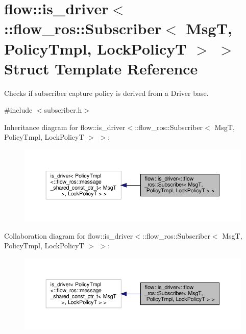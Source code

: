 \hypertarget{structflow_1_1is__driver_3_1_1flow__ros_1_1_subscriber_3_01_msg_t_00_01_policy_tmpl_00_01_lock_policy_t_01_4_01_4}{}\section{flow\+:\+:is\+\_\+driver$<$\+:\+:flow\+\_\+ros\+:\+:Subscriber$<$ MsgT, Policy\+Tmpl, Lock\+PolicyT $>$ $>$ Struct Template Reference}
\label{structflow_1_1is__driver_3_1_1flow__ros_1_1_subscriber_3_01_msg_t_00_01_policy_tmpl_00_01_lock_policy_t_01_4_01_4}


Checks if subscriber capture policy is derived from a Driver base.  




{\ttfamily \#include $<$subscriber.\+h$>$}



Inheritance diagram for flow\+:\+:is\+\_\+driver$<$\+:\+:flow\+\_\+ros\+:\+:Subscriber$<$ MsgT, Policy\+Tmpl, Lock\+PolicyT $>$ $>$\+:\nopagebreak
\begin{figure}[H]
\begin{center}
\leavevmode
\includegraphics[width=350pt]{structflow_1_1is__driver_3_1_1flow__ros_1_1_subscriber_3_01_msg_t_00_01_policy_tmpl_00_01_lock_pad823e27bc9f39ecff1cc3ffbaaad8f4}
\end{center}
\end{figure}


Collaboration diagram for flow\+:\+:is\+\_\+driver$<$\+:\+:flow\+\_\+ros\+:\+:Subscriber$<$ MsgT, Policy\+Tmpl, Lock\+PolicyT $>$ $>$\+:\nopagebreak
\begin{figure}[H]
\begin{center}
\leavevmode
\includegraphics[width=350pt]{structflow_1_1is__driver_3_1_1flow__ros_1_1_subscriber_3_01_msg_t_00_01_policy_tmpl_00_01_lock_policy_t_01_4_01_4__coll__graph}
\end{center}
\end{figure}


